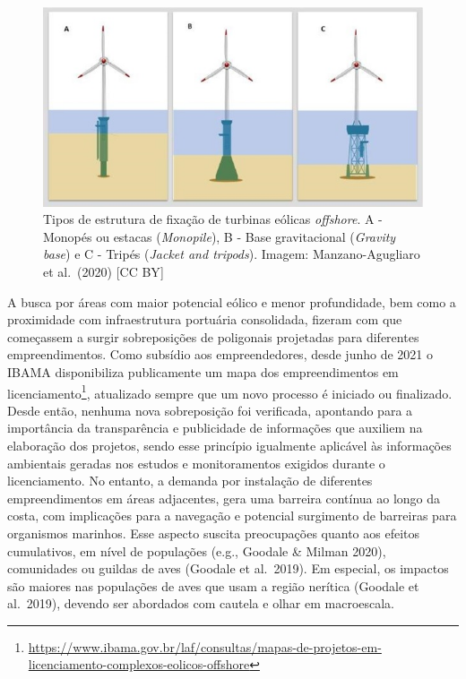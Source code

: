 \documentclass[
  oneside]{scrbook}
\DeclareRobustCommand{\href}[2]{#2\footnote{\url{#1}}}
\begin{document}
\begin{figure}[H]

{\centering \includegraphics[width=0.75\linewidth]{imagens/cap08/Figura_8.5} 

}

\caption{Tipos de estrutura de fixação de turbinas eólicas \emph{offshore}. A - Monopés ou estacas (\emph{Monopile}), B - Base gravitacional (\emph{Gravity base}) e C - Tripés (\emph{Jacket and tripods}). Imagem: Manzano-Agugliaro et al.~(2020) {[}CC BY{]}}\label{fig:65}
\end{figure}



A busca por áreas com maior potencial eólico e menor profundidade, bem como a proximidade com infraestrutura portuária consolidada, fizeram com que começassem a surgir sobreposições de poligonais projetadas para diferentes empreendimentos. Como subsídio aos empreendedores, desde junho de 2021 o IBAMA disponibiliza publicamente um \href{https://www.ibama.gov.br/laf/consultas/mapas-de-projetos-em-licenciamento-complexos-eolicos-offshore}{mapa dos empreendimentos em licenciamento}, atualizado sempre que um novo processo é iniciado ou finalizado. Desde então, nenhuma nova sobreposição foi verificada, apontando para a importância da transparência e publicidade de informações que auxiliem na elaboração dos projetos, sendo esse princípio igualmente aplicável às informações ambientais geradas nos estudos e monitoramentos exigidos durante o licenciamento. No entanto, a demanda por instalação de diferentes empreendimentos em áreas adjacentes, gera uma barreira contínua ao longo da costa, com implicações para a navegação e potencial surgimento de barreiras para organismos marinhos. Esse aspecto suscita preocupações quanto aos efeitos cumulativos, em nível de populações (e.g., Goodale \& Milman 2020), comunidades ou guildas de aves (Goodale et al.~2019). Em especial, os impactos são maiores nas populações de aves que usam a região nerítica (Goodale et al.~2019), devendo ser abordados com cautela e olhar em macroescala.
\end{document}
